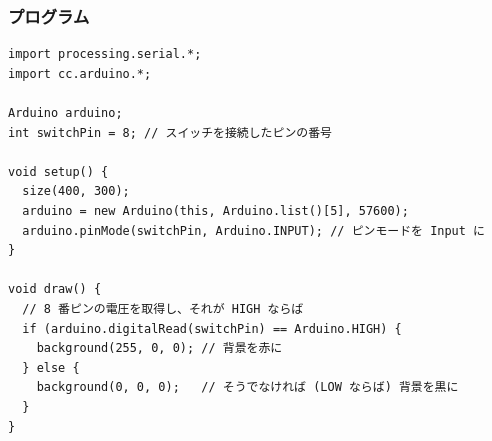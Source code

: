 \documentclass[11pt,a4paper]{jarticle}
\begin{document}
\subsubsection*{プログラム}
\begin{lstlisting}
import processing.serial.*;
import cc.arduino.*;

Arduino arduino;
int switchPin = 8; // スイッチを接続したピンの番号
 
void setup() {
  size(400, 300);
  arduino = new Arduino(this, Arduino.list()[5], 57600);
  arduino.pinMode(switchPin, Arduino.INPUT); // ピンモードを Input に
}
 
void draw() {
  // 8 番ピンの電圧を取得し、それが HIGH ならば
  if (arduino.digitalRead(switchPin) == Arduino.HIGH) {
    background(255, 0, 0); // 背景を赤に
  } else {
    background(0, 0, 0);   // そうでなければ (LOW ならば) 背景を黒に
  }
}
\end{lstlisting}







 
 
\end{document}

